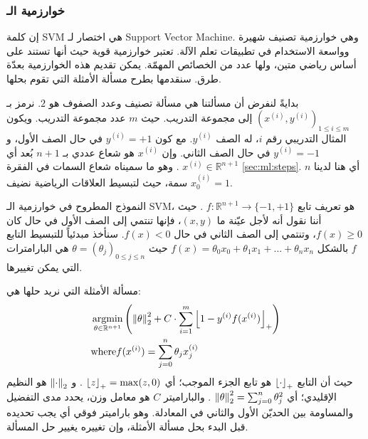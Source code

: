 \subsubsection{خوارزمية الـ }
إن كلمة \textenglish{SVM} هي اختصار لـ \textenglish{Support Vector Machine}.
وهي خوارزمية تصنيف شهيرة وواسعة الاستخدام في تطبيقات تعلم الآلة.
تعتبر خوارزمية قوية حيث أنها تستند على أساس رياضي متين، ولها عدد من الخصائص المهمّة.
يمكن تقديم هذه الخوارزمية بعدّة طرق.
سنقدمها بطرح مسألة الأمثلة التي تقوم بحلها.

بدايةً لنفرض أن مسألتنا هي مسألة تصنيف وعدد الصفوف هو $2$.
نرمز بـ
$(x^{(i)}, y^{(i)})_{1 \leq i \leq m}$
إلى مجموعة التدريب.
حيث $m$ عدد مجموعة التدريب.
ويكون المثال التدريبي رقم $i$، له الصف $ y^{(i)} $.
مع كون $ y^{(i)} = +1 $ في حال الصف الأول، و $ y^{(i)} = -1 $ في حال الصف الثاني.
وإن $ x^{(i)} $ هو شعاع عددي بـ $ n+1 $ بُعد أي
$ x^{(i)} \in \mathbb{R}^{n+1} $%
. وهو ما سميناه شعاع السمات في الفقرة \ref{sec:ml:steps}.
أي هنا لدينا $n$ سمة، حيث لتبسيط العلاقات الرياضية نضيف $ x^{(i)}_0 = 1 $.

النموذج المطروح في خوارزمية الـ \textenglish{SVM}، هو تعريف تابع 
$ f: \mathbb{R}^{n+1} \rightarrow \{-1, +1 \} $%
. حيث أننا نقول أنه لأجل عيّنة ما $ (x, y) $، فإنها تنتمي إلى الصف الأول في حال كان $ f(x) \geq 0 $،
وتنتمي إلى الصف الثاني في حال $ f(x) < 0 $.
سنأخذ مبدئياً للتبسيط التابع $f$ بالشكل
$ f(x) = \theta_0 x_0 + \theta_1 x_1 + \dots + \theta_n x_n $
حيث
$ \theta = (\theta_j)_{0 \leq j \leq n} $
هي البارامترات التي يمكن تغييرها.

مسألة الأمثلة التي نريد حلها هي:
\begin{align}
\label{eq:svm:primal}
&
\argmin_{\theta \in \mathbb{R}^{n+1} } \left(
\norm{\theta}^2 +
C \cdot \sum_{i = 1}^{m} \pospart{1 - y^{(i)} f(x^{(i)})}
\right)
\\
&
\mathrm{where}
f(x^{(i)}) = \sum_{j = 0}^{n} \theta_j x^{(i)}_j
\nonumber
\end{align}
حيث أن التابع
$\left\lfloor\cdot\right\rfloor_{+}$
هو تابع الجزء الموجب؛ أي
$ \left\lfloor z\right\rfloor_{+} = \max(z, 0) $%
. و
$ \left\lVert\cdot\right\rVert_{2} $
هو النظيم الإقليدي؛ أي
$ \left\lVert\theta\right\rVert_{2}^2 = \sum_{j=0}^{n} \theta_j^2 $%
. والباراميتر $C$ هو معامل وزن، يحدد مدى التفضيل والمساومة بين الحديّن الأول والثاني في المعادلة.
وهو باراميتر فوقي  أي يجب تحديده قبل البدء بحل مسألة الأمثلة، وإن تغييره يغيير حل المسألة.

